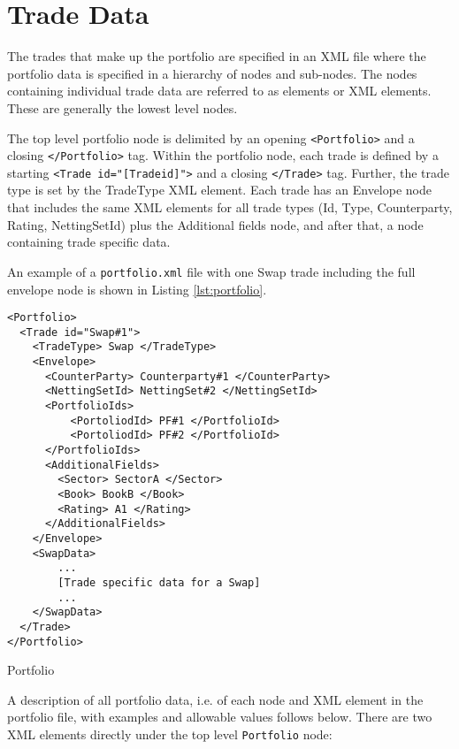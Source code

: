 \section{Trade Data}\label{sec:portfolio_data}

The trades that make up the portfolio are specified in an XML file where the portfolio data is specified in a hierarchy
of nodes and sub-nodes.  The nodes containing individual trade data are referred to as elements or XML elements. These
are generally the lowest level nodes.

\vspace{1em}

The top level portfolio node is delimited by an opening {\tt <Portfolio>} and a closing {\tt </Portfolio>} tag. Within
the portfolio node, each trade is defined by a starting {\tt <Trade id="[Tradeid]">} and a closing {\tt </Trade>} tag.
Further, the trade type is set by the TradeType XML element. Each trade has an Envelope node that includes the same XML
elements for all trade types (Id, Type, Counterparty, Rating, NettingSetId) plus the Additional fields node, and after
that, a node containing trade specific data.

\vspace{1em}
An example of a {\tt portfolio.xml} file with one Swap trade including the full envelope node is shown in Listing \ref{lst:portfolio}.

\begin{listing}[H]
\begin{verbatim}
<Portfolio>
  <Trade id="Swap#1">
    <TradeType> Swap </TradeType>
    <Envelope>
      <CounterParty> Counterparty#1 </CounterParty>
      <NettingSetId> NettingSet#2 </NettingSetId>
      <PortfolioIds>
          <PortoliodId> PF#1 </PortfolioId>
          <PortoliodId> PF#2 </PortfolioId>
      </PortfolioIds>
      <AdditionalFields>
        <Sector> SectorA </Sector>
        <Book> BookB </Book>
        <Rating> A1 </Rating>
      </AdditionalFields>
    </Envelope>
    <SwapData>
        ...
        [Trade specific data for a Swap]
        ...
    </SwapData>
  </Trade>
</Portfolio>
\end{verbatim}
\caption{Portfolio}
\label{lst:portfolio}
\end{listing}

A description of all portfolio data, i.e. of each node and XML element in the portfolio file, with examples and
allowable values follows below. There are two XML elements directly under the top level {\tt Portfolio} node:

